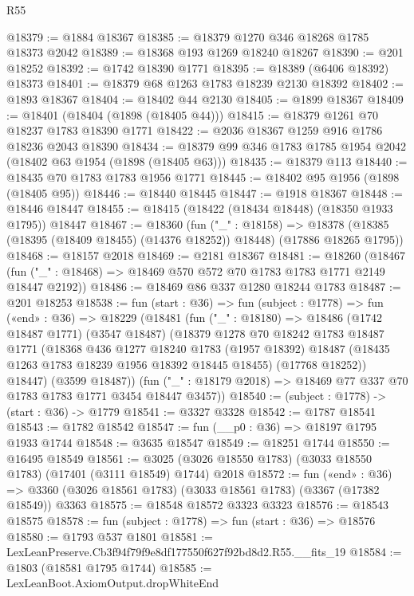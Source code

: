 \begin{lexlean}{R55}
\begin{coremodule}
@18379 := @1884 @18367
@18385 := @18379 @1270 @346 @18268 @1785 @18373 @2042
@18389 := @18368 @193 @1269 @18240 @18267
@18390 := @201 @18252
@18392 := @1742 @18390 @1771
@18395 := @18389 (@6406 @18392) @18373
@18401 := @18379 @68 @1263 @1783 @18239 @2130 @18392
@18402 := @1893 @18367
@18404 := @18402 @44 @2130
@18405 := @1899 @18367
@18409 := @18401 (@18404 (@1898 (@18405 @44)))
@18415 := @18379 @1261 @70 @18237 @1783 @18390 @1771
@18422 := @2036 @18367 @1259 @916 @1786 @18236 @2043 @18390
@18434 := @18379 @99 @346 @1783 @1785 @1954 @2042 (@18402 @63 @1954 (@1898 (@18405 @63)))
@18435 := @18379 @113
@18440 := @18435 @70 @1783 @1783 @1956 @1771
@18445 := @18402 @95 @1956 (@1898 (@18405 @95))
@18446 := @18440 @18445
@18447 := @1918 @18367
@18448 := @18446 @18447
@18455 := @18415 (@18422 (@18434 @18448) (@18350 @1933 @1795)) @18447
@18467 := @18360
    (fun ("_" : @18158) =>
    @18378 (@18385 (@18395 (@18409 @18455) (@14376 @18252)) @18448) (@17886 @18265 @1795))
@18468 := @18157 @2018
@18469 := @2181 @18367
@18481 := @18260
    (@18467 (fun ("_" : @18468) => @18469 @570 @572 @70 @1783 @1783 @1771 @2149 @18447 @2192))
@18486 := @18469 @86 @337 @1280 @18244 @1783
@18487 := @201 @18253
@18538 := fun (start : @36) =>
  fun (subject : @1778) =>
  fun («end» : @36) =>
  @18229
    (@18481
      (fun ("_" : @18180) =>
      @18486
        (@1742 @18487 @1771)
        (@3547 @18487)
        (@18379
          @1278
          @70
          @18242
          @1783
          @18487
          @1771
          (@18368
            @436
            @1277
            @18240
            @1783
            (@1957 @18392)
            @18487
            (@18435 @1263 @1783 @18239 @1956 @18392 @18445 @18455)
            (@17768 @18252))
          @18447)
        (@3599 @18487))
      (fun ("_" : @18179 @2018) => @18469 @77 @337 @70 @1783 @1783 @1771 @3454 @18447 @3457))
@18540 := (subject : @1778) -> (start : @36) -> @1779
@18541 := @3327 @3328
@18542 := @1787 @18541
@18543 := @1782 @18542
@18547 := fun (__p0 : @36) => @18197 @1795 @1933 @1744
@18548 := @3635 @18547
@18549 := @18251 @1744
@18550 := @16495 @18549
@18561 := @3025 (@3026 @18550 @1783) (@3033 @18550 @1783) (@17401 (@3111 @18549) @1744) @2018
@18572 := fun («end» : @36) =>
  @3360 (@3026 @18561 @1783) (@3033 @18561 @1783) (@3367 (@17382 @18549)) @3363
@18575 := @18548 @18572 @3323 @3323
@18576 := @18543 @18575
@18578 := fun (subject : @1778) => fun (start : @36) => @18576
@18580 := @1793 @537 @1801
@18581 := LexLeanPreserve.Cb3f94f79f9e8df177550f627f92bd8d2.R55.__fits_19
@18584 := @1803 (@18581 @1795 @1744)
@18585 := LexLeanBoot.AxiomOutput.dropWhiteEnd

\end{coremodule}
\end{lexlean}
